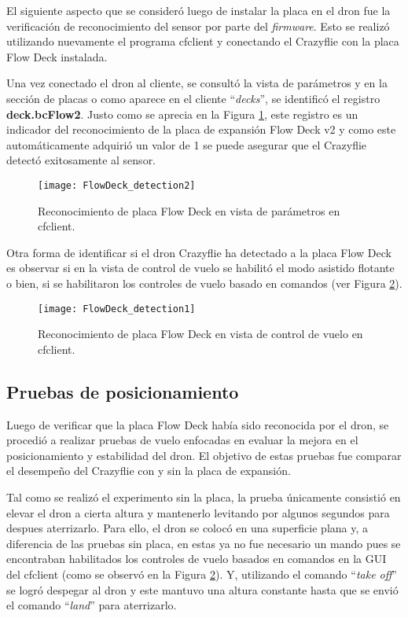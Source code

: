 El siguiente aspecto que se consideró luego de instalar la placa en el dron fue la verificación de reconocimiento del sensor por parte del \textit{firmware}. Esto se realizó utilizando nuevamente el programa cfclient y conectando el Crazyflie con la placa Flow Deck instalada. 

Una vez conectado el dron al cliente, se consultó la vista de parámetros y en la sección de placas o como aparece en el cliente ``\textit{decks}'', se identificó el registro \textbf{deck.bcFlow2}. Justo como se aprecia en la Figura \ref{fig:FlowDeck_detection2}, este registro es un indicador del reconocimiento de la placa de expansión Flow Deck v2 y como este automáticamente adquirió un valor de 1 se puede asegurar que el Crazyflie detectó exitosamente al sensor.

\begin{figure}[htbp]
	\centering
	\texttt{[image: FlowDeck\_detection2]}
	\caption{Reconocimiento de placa Flow Deck en vista de parámetros en cfclient.}
	\label{fig:FlowDeck_detection2}
\end{figure} 

Otra forma de identificar si el dron Crazyflie ha detectado a la placa Flow Deck es observar si en la vista de control de vuelo se habilitó el modo asistido flotante o bien, si se habilitaron los controles de vuelo basado en comandos (ver Figura \ref{fig:FlowDeck_detection1}). 

\begin{figure}[htbp]
	\centering
	\texttt{[image: FlowDeck\_detection1]}
	\caption{Reconocimiento de placa Flow Deck en vista de control de vuelo en cfclient.}
	\label{fig:FlowDeck_detection1}
\end{figure} 
 
\subsection{Pruebas de posicionamiento}
Luego de verificar que la placa Flow Deck había sido reconocida por el dron, se procedió a realizar pruebas de vuelo enfocadas en evaluar la mejora en el posicionamiento y estabilidad del dron. El objetivo de estas pruebas fue comparar el desempeño del Crazyflie con y sin la placa de expansión.

Tal como se realizó el experimento sin la placa, la prueba únicamente consistió en elevar el dron a cierta altura y mantenerlo levitando por algunos segundos para despues aterrizarlo. Para ello, el dron se colocó en una superficie plana y, a diferencia de las pruebas sin placa, en estas ya no fue necesario un mando pues se encontraban habilitados los controles de vuelo basados en comandos en la GUI del cfclient (como se observó en la Figura \ref{fig:FlowDeck_detection1}). Y, utilizando el comando ``\textit{take off}'' se logró despegar al dron y este mantuvo una altura constante hasta que se envió el comando ``\textit{land}'' para aterrizarlo. 

